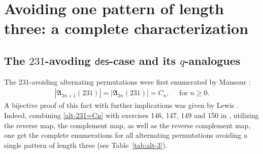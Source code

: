 \documentclass[12pt,reqno]{amsart}
\numberwithin{equation}{section}
\theoremstyle{plain}
\theoremstyle{definition}
\def\A{\mathfrak{A}}
\def\des{\mathsf{des}}
\begin{document}
\section{Avoiding one pattern of length three: a complete characterization}\label{sec5: Cat}
\subsection{\texorpdfstring{The $231$-avoding $\des$-case and its $q$-analogues}{}}
The $231$-avoiding alternating permutations were first enumerated by Mansour \cite{Man}:
\begin{align}\label{alt-231=Cn}
|\A_{2n+1}(231)|=|\A_{2n}(231)|=C_n,\quad \text{ for }n\ge 0.
\end{align}
A bijective proof of this fact with further implications was given by Lewis \cite{Lew1}. Indeed, combining \eqref{alt-231=Cn} with exercises 146, 147, 149 and 150 in \cite{Sta2}, utilizing the reverse map, the complement map, as well as the reverse complement map, one get the complete enumerations for all alternating permutations avoiding a single pattern of length three (see Table~\ref{tab:alt-3}).
\end{document}
